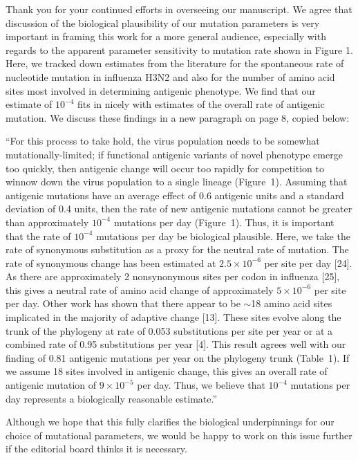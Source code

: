 \documentclass[stdletter,a4paper,noaddrfrom,orderfromdateto,11pt]{newlfm}
\begin{document}
\begin{newlfm}

Thank you for your continued efforts in overseeing our manuscript.  We agree that discussion of the biological plausibility of our mutation parameters is very important in framing this work for a more general audience, especially with regards to the apparent parameter sensitivity to mutation rate shown in Figure 1.  Here, we tracked down estimates from the literature for the spontaneous rate of nucleotide mutation in influenza H3N2 and also for the number of amino acid sites most involved in determining antigenic phenotype.  We find that our estimate of $10^{-4}$ fits in nicely with estimates of the overall rate of antigenic mutation.  We discuss these findings in a new paragraph on page 8, copied below:

``For this process to take hold, the virus population needs to be somewhat mutationally-limited; if functional antigenic variants of novel phenotype emerge too quickly, then antigenic change will occur too rapidly for competition to winnow down the virus population to a single lineage (Figure~1).  Assuming that antigenic mutations have an average effect of 0.6 antigenic units and a standard deviation of 0.4 units, then the rate of new antigenic mutations cannot be greater than approximately $10^{-4}$ mutations per day (Figure~1).  Thus, it is important that the rate of $10^{-4}$ mutations per day be biological plausible.  Here, we take the rate of synonymous substitution as a proxy for the neutral rate of mutation.  The rate of synonymous change has been estimated at $2.5 \times 10^{-6}$ per site per day [24].  As there are approximately 2 nonsynonymous sites per codon in influenza [25], this gives a neutral rate of amino acid change of approximately $5 \times 10^{-6}$ per site per day.  Other work has shown that there appear to be $\sim$18 amino acid sites implicated in the majority of adaptive change [13].  These sites evolve along the trunk of the phylogeny at rate of 0.053 substitutions per site per year or at a combined rate of 0.95 substitutions per year [4].  This result agrees well with our finding of 0.81 antigenic mutations per year on the phylogeny trunk (Table~1).  If we assume 18 sites involved in antigenic change, this gives an overall rate of antigenic mutation of $9 \times 10^{-5}$ per day.  Thus, we believe that $10^{-4}$ mutations per day represents a biologically reasonable estimate.''

Although we hope that this fully clarifies the biological underpinnings for our choice of mutational parameters, we would be happy to work on this issue further if the editorial board thinks it is necessary.

\end{newlfm}
\end{document}
